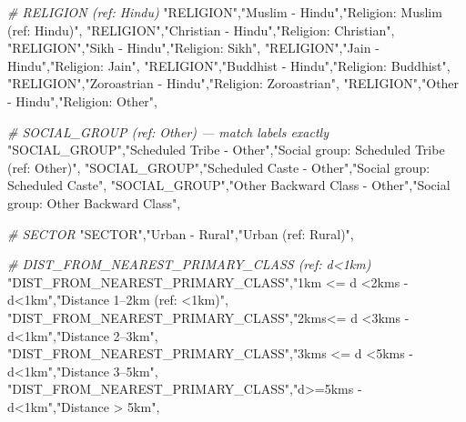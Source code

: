 \documentclass[
]{article}
\newenvironment{Shaded}{\begin{snugshade}}{\end{snugshade}}
\newcommand{\CommentTok}[1]{\textcolor[rgb]{0.56,0.35,0.01}{\textit{#1}}}
\newcommand{\NormalTok}[1]{#1}
\newcommand{\StringTok}[1]{\textcolor[rgb]{0.31,0.60,0.02}{#1}}
\begin{document}
\begin{Shaded}
\begin{Highlighting}[]
  \CommentTok{\# RELIGION (ref: Hindu)}
  \StringTok{"RELIGION"}\NormalTok{,}\StringTok{"Muslim {-} Hindu"}\NormalTok{,}\StringTok{"Religion: Muslim (ref: Hindu)"}\NormalTok{,}
  \StringTok{"RELIGION"}\NormalTok{,}\StringTok{"Christian {-} Hindu"}\NormalTok{,}\StringTok{"Religion: Christian"}\NormalTok{,}
  \StringTok{"RELIGION"}\NormalTok{,}\StringTok{"Sikh {-} Hindu"}\NormalTok{,}\StringTok{"Religion: Sikh"}\NormalTok{,}
  \StringTok{"RELIGION"}\NormalTok{,}\StringTok{"Jain {-} Hindu"}\NormalTok{,}\StringTok{"Religion: Jain"}\NormalTok{,}
  \StringTok{"RELIGION"}\NormalTok{,}\StringTok{"Buddhist {-} Hindu"}\NormalTok{,}\StringTok{"Religion: Buddhist"}\NormalTok{,}
  \StringTok{"RELIGION"}\NormalTok{,}\StringTok{"Zoroastrian {-} Hindu"}\NormalTok{,}\StringTok{"Religion: Zoroastrian"}\NormalTok{,}
  \StringTok{"RELIGION"}\NormalTok{,}\StringTok{"Other {-} Hindu"}\NormalTok{,}\StringTok{"Religion: Other"}\NormalTok{,}

  \CommentTok{\# SOCIAL\_GROUP (ref: Other) — match labels exactly}
  \StringTok{"SOCIAL\_GROUP"}\NormalTok{,}\StringTok{"Scheduled Tribe {-} Other"}\NormalTok{,}\StringTok{"Social group: Scheduled Tribe (ref: Other)"}\NormalTok{,}
  \StringTok{"SOCIAL\_GROUP"}\NormalTok{,}\StringTok{"Scheduled Caste {-} Other"}\NormalTok{,}\StringTok{"Social group: Scheduled Caste"}\NormalTok{,}
  \StringTok{"SOCIAL\_GROUP"}\NormalTok{,}\StringTok{"Other Backward Class {-} Other"}\NormalTok{,}\StringTok{"Social group: Other Backward Class"}\NormalTok{,}

  \CommentTok{\# SECTOR}
  \StringTok{"SECTOR"}\NormalTok{,}\StringTok{"Urban {-} Rural"}\NormalTok{,}\StringTok{"Urban (ref: Rural)"}\NormalTok{,}

  \CommentTok{\# DIST\_FROM\_NEAREST\_PRIMARY\_CLASS (ref: d\textless{}1km)}
  \StringTok{"DIST\_FROM\_NEAREST\_PRIMARY\_CLASS"}\NormalTok{,}\StringTok{"1km \textless{}= d \textless{}2kms {-} d\textless{}1km"}\NormalTok{,}\StringTok{"Distance 1–2km (ref: \textless{}1km)"}\NormalTok{,}
  \StringTok{"DIST\_FROM\_NEAREST\_PRIMARY\_CLASS"}\NormalTok{,}\StringTok{"2kms\textless{}= d \textless{}3kms {-} d\textless{}1km"}\NormalTok{,}\StringTok{"Distance 2–3km"}\NormalTok{,}
  \StringTok{"DIST\_FROM\_NEAREST\_PRIMARY\_CLASS"}\NormalTok{,}\StringTok{"3kms \textless{}= d \textless{}5kms {-} d\textless{}1km"}\NormalTok{,}\StringTok{"Distance 3–5km"}\NormalTok{,}
  \StringTok{"DIST\_FROM\_NEAREST\_PRIMARY\_CLASS"}\NormalTok{,}\StringTok{"d\textgreater{}=5kms {-} d\textless{}1km"}\NormalTok{,}\StringTok{"Distance \textgreater{} 5km"}\NormalTok{,}


\end{Highlighting}
\end{Shaded}
\end{document}
